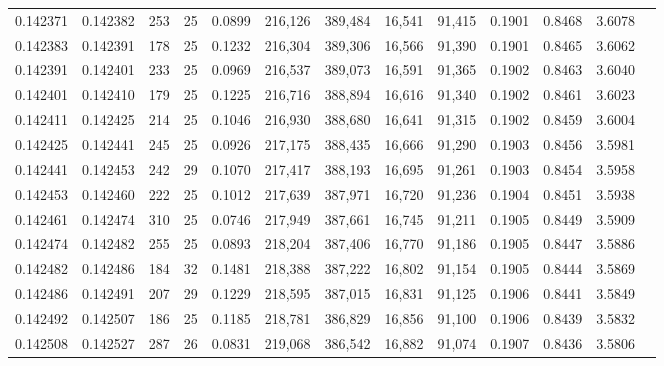 \begin{tabular}{rrrrrrrrrrrrr}
0.142371 & 0.142382 & 253 &  25 &                                     0.0899 & 216,126 & 389,484 &  16,541 &  91,415 & 0.1901 & 0.8468 & 3.6078 \\
0.142383 & 0.142391 & 178 &  25 &                                     0.1232 & 216,304 & 389,306 &  16,566 &  91,390 & 0.1901 & 0.8465 & 3.6062 \\
0.142391 & 0.142401 & 233 &  25 &                                     0.0969 & 216,537 & 389,073 &  16,591 &  91,365 & 0.1902 & 0.8463 & 3.6040 \\
0.142401 & 0.142410 & 179 &  25 &                                     0.1225 & 216,716 & 388,894 &  16,616 &  91,340 & 0.1902 & 0.8461 & 3.6023 \\
0.142411 & 0.142425 & 214 &  25 &                                     0.1046 & 216,930 & 388,680 &  16,641 &  91,315 & 0.1902 & 0.8459 & 3.6004 \\
0.142425 & 0.142441 & 245 &  25 &                                     0.0926 & 217,175 & 388,435 &  16,666 &  91,290 & 0.1903 & 0.8456 & 3.5981 \\
0.142441 & 0.142453 & 242 &  29 &                                     0.1070 & 217,417 & 388,193 &  16,695 &  91,261 & 0.1903 & 0.8454 & 3.5958 \\
0.142453 & 0.142460 & 222 &  25 &                                     0.1012 & 217,639 & 387,971 &  16,720 &  91,236 & 0.1904 & 0.8451 & 3.5938 \\
0.142461 & 0.142474 & 310 &  25 &                                     0.0746 & 217,949 & 387,661 &  16,745 &  91,211 & 0.1905 & 0.8449 & 3.5909 \\
0.142474 & 0.142482 & 255 &  25 &                                     0.0893 & 218,204 & 387,406 &  16,770 &  91,186 & 0.1905 & 0.8447 & 3.5886 \\
0.142482 & 0.142486 & 184 &  32 &                                     0.1481 & 218,388 & 387,222 &  16,802 &  91,154 & 0.1905 & 0.8444 & 3.5869 \\
0.142486 & 0.142491 & 207 &  29 &                                     0.1229 & 218,595 & 387,015 &  16,831 &  91,125 & 0.1906 & 0.8441 & 3.5849 \\
0.142492 & 0.142507 & 186 &  25 &                                     0.1185 & 218,781 & 386,829 &  16,856 &  91,100 & 0.1906 & 0.8439 & 3.5832 \\
0.142508 & 0.142527 & 287 &  26 &                                     0.0831 & 219,068 & 386,542 &  16,882 &  91,074 & 0.1907 & 0.8436 & 3.5806 \\

\end{tabular}
